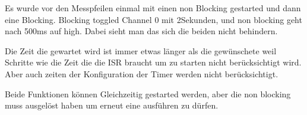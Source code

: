\documentclass{article}
\begin{document}
Es wurde vor den Messpfeilen einmal mit einen non Blocking gestarted und dann eine Blocking. Blocking toggled Channel 0 mit 2Sekunden, und non blocking geht nach 500ms auf high. Dabei sieht man das sich die beiden nicht behindern.

Die Zeit die gewartet wird ist immer etwas länger als die gewünschete weil Schritte wie die Zeit die die ISR braucht um zu starten nicht berücksichtigt wird.
Aber auch zeiten der Konfiguration der Timer werden nicht berücksichtigt.

Beide Funktionen können Gleichzeitig gestarted werden, aber die non blocking muss ausgelöst haben um erneut eine ausführen zu dürfen.
\end{document}
